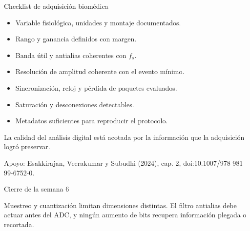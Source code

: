 \documentclass[
  ignorenonframetext,
  aspectratio=169,
  spanish,
  professionalfonts]{beamer}
\providecommand{\tightlist}{%
  \setlength{\itemsep}{0pt}\setlength{\parskip}{0pt}}
\begin{document}
\begin{frame}{Checklist de adquisición biomédica}
\protect{}\label{checklist-de-adquisiciuxf3n-biomuxe9dica}
\begin{itemize}
\tightlist
\item[$\square$]
  Variable fisiológica, unidades y montaje documentados.
\item[$\square$]
  Rango y ganancia definidos con margen.
\item[$\square$]
  Banda útil y antialias coherentes con \(f_s\).
\item[$\square$]
  Resolución de amplitud coherente con el evento mínimo.
\item[$\square$]
  Sincronización, reloj y pérdida de paquetes evaluados.
\item[$\square$]
  Saturación y desconexiones detectables.
\item[$\square$]
  Metadatos suficientes para reproducir el protocolo.
\end{itemize}

\begin{tcolorbox}[enhanced jigsaw, arc=.35mm, bottomrule=.15mm, bottomtitle=1mm, breakable, colback=white, colbacktitle=quarto-callout-important-color!10!white, colframe=quarto-callout-important-color-frame, coltitle=black, left=2mm, leftrule=.75mm, opacityback=0, opacitybacktitle=0.6, rightrule=.15mm, title={Principio rector}, titlerule=0mm, toprule=.15mm, toptitle=1mm]

La calidad del análisis digital está acotada por la información que la
adquisición logró preservar.

\end{tcolorbox}

Apoyo: Esakkirajan, Veerakumar y Subudhi (2024), cap. 2,
doi:10.1007/978-981-99-6752-0.
\end{frame}

\begin{frame}{Cierre de la semana 6}
\protect{}\label{cierre-de-la-semana-6}
\begin{tcolorbox}[enhanced jigsaw, arc=.35mm, bottomrule=.15mm, bottomtitle=1mm, breakable, colback=white, colbacktitle=quarto-callout-important-color!10!white, colframe=quarto-callout-important-color-frame, coltitle=black, left=2mm, leftrule=.75mm, opacityback=0, opacitybacktitle=0.6, rightrule=.15mm, title={Síntesis}, titlerule=0mm, toprule=.15mm, toptitle=1mm]

Muestreo y cuantización limitan dimensiones distintas. El filtro
antialias debe actuar antes del ADC, y ningún aumento de bits recupera
información plegada o recortada.

\end{tcolorbox}
\end{frame}
\end{document}
